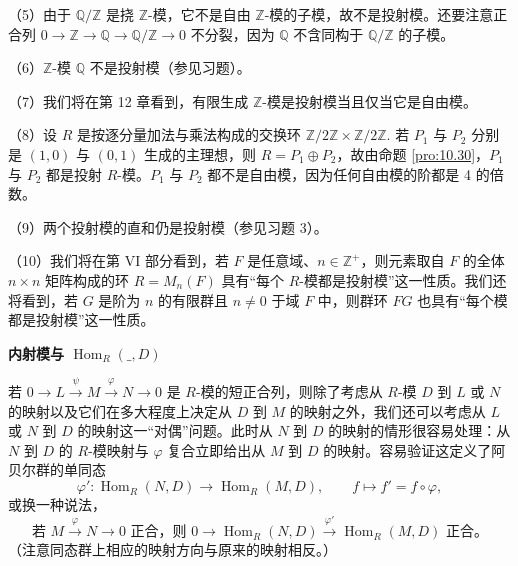 \begin{example}
（5）由于 \(\mathbb{Q}/\mathbb{Z}\) 是挠 \(\mathbb{Z}\)-模，它不是自由 \(\mathbb{Z}\)-模的子模，故不是投射模。还要注意正合列 \(0 \to \mathbb{Z} \to \mathbb{Q} \to \mathbb{Q}/\mathbb{Z} \to 0\) 不分裂，因为 \(\mathbb{Q}\) 不含同构于 \(\mathbb{Q}/\mathbb{Z}\) 的子模。

（6）\(\mathbb{Z}\)-模 \(\mathbb{Q}\) 不是投射模（参见习题）。

（7）我们将在第 12 章看到，有限生成 \(\mathbb{Z}\)-模是投射模当且仅当它是自由模。

（8）设 \(R\) 是按逐分量加法与乘法构成的交换环 \(\mathbb{Z}/2\mathbb{Z} \times \mathbb{Z}/2\mathbb{Z}\). 若 \(P_1\) 与 \(P_2\) 分别是 \((1, 0)\) 与 \((0, 1)\) 生成的主理想，则 \(R = P_1 \oplus P_2\)，故由命题 \ref{pro:10.30}，\(P_1\) 与 \(P_2\) 都是投射 \(R\)-模。\(P_1\) 与 \(P_2\) 都不是自由模，因为任何自由模的阶都是 4 的倍数。

（9）两个投射模的直和仍是投射模（参见习题 3）。

（10）我们将在第 VI 部分看到，若 \(F\) 是任意域、\(n \in \mathbb{Z}^+\)，则元素取自 \(F\) 的全体 \(n \times n\) 矩阵构成的环 \(R = M_n(F)\) 具有“每个 \(R\)-模都是投射模”这一性质。我们还将看到，若 \(G\) 是阶为 \(n\) 的有限群且 \(n \neq 0\) 于域 \(F\) 中，则群环 \(FG\) 也具有“每个模都是投射模”这一性质。
\end{example}

\noindent\textbf{内射模与 \(\operatorname{Hom}_R(\_, D)\)}

若 \(0 \to L \xrightarrow{\psi} M \xrightarrow{\varphi} N \to 0\) 是 \(R\)-模的短正合列，则除了考虑从 \(R\)-模 \(D\) 到 \(L\) 或 \(N\) 的映射以及它们在多大程度上决定从 \(D\) 到 \(M\) 的映射之外，我们还可以考虑从 \(L\) 或 \(N\) 到 \(D\) 的映射这一“对偶”问题。此时从 \(N\) 到 \(D\) 的映射的情形很容易处理：从 \(N\) 到 \(D\) 的 \(R\)-模映射与 \(\varphi\) 复合立即给出从 \(M\) 到 \(D\) 的映射。容易验证这定义了阿贝尔群的单同态
\[
\varphi' : \operatorname{Hom}_R(N, D) \to \operatorname{Hom}_R(M, D), \qquad f \mapsto f' = f \circ \varphi,
\]
或换一种说法，
\[
\text{若 } M \xrightarrow{\varphi} N \to 0 \text{ 正合，则 } 0 \to \operatorname{Hom}_R(N, D) \xrightarrow{\varphi'} \operatorname{Hom}_R(M, D) \text{ 正合}。
\]
（注意同态群上相应的映射方向与原来的映射相反。）

